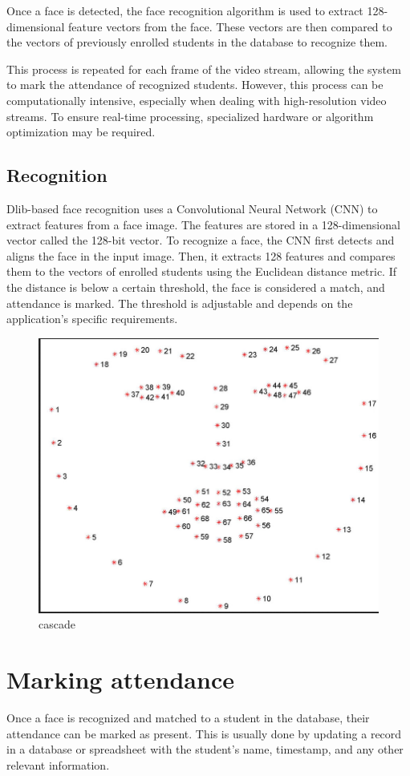 Once a face is detected, the face recognition algorithm is used to extract 128-dimensional feature vectors from the face. These vectors are then compared to the vectors of previously enrolled students in the database to recognize them.

This process is repeated for each frame of the video stream, allowing the system to mark the attendance of recognized students. However, this process can be computationally intensive, especially when dealing with high-resolution video streams. To ensure real-time processing, specialized hardware or algorithm optimization may be required.

\subsection{Recognition}
Dlib-based face recognition uses a Convolutional Neural Network (CNN) to extract features from a face image. The features are stored in a 128-dimensional vector called the 128-bit vector. To recognize a face, the CNN first detects and aligns the face in the input image. Then, it extracts 128 features and compares them to the vectors of enrolled students using the Euclidean distance metric. If the distance is below a certain threshold, the face is considered a match, and attendance is marked. The threshold is adjustable and depends on the application's specific requirements.

\begin{figure}[!htb]
    \centering
    \includegraphics[width=\linewidth,height=0.8\linewidth]{Figures/Ch01/128bit.png}
    \caption{cascade}
    \label{figure:cascade2}
    \end{figure}

\section{Marking attendance}
Once a face is recognized and matched to a student in the database, their attendance can be marked as present. This is usually done by updating a record in a database or spreadsheet with the student's name, timestamp, and any other relevant information.